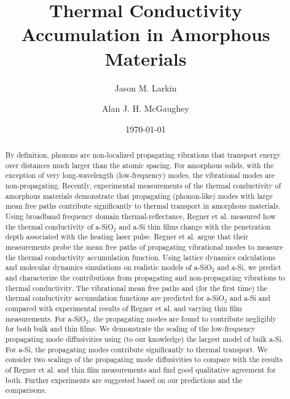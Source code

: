 \documentclass[aps,prb,twocolumn,superscriptaddress,footinbib,amsmath,amssymb,floatfix]{revtex4}
\begin{document}
\title{Thermal Conductivity Accumulation in Amorphous Materials}
\author{Jason M. Larkin}
\author{Alan J. H. McGaughey}
\date{\today}
\begin{abstract}

By definition, phonons are non-localized propagating vibrations that 
transport energy over distances much larger than the atomic spacing. For 
amorphous solids, with the 
exception 
of very long-wavelength (low-frequency) modes, the vibrational modes are 
non-propagating. 
Recently, 
experimental measurements of the thermal conductivity of amorphous 
materials demonstrate that 
propagating (phonon-like) modes with large mean free paths 
contribute significantly to thermal transport in amorphous 
materials.\cite{regner_broadband_2013,sultan_heat_2013} 
Using broadband frequency domain thermal-reflectance, 
Regner et al. measured how the thermal conductivity of a-SiO$_2$ and 
a-Si thin films change with the penetration depth associated with the 
heating laser pulse.\cite{regner_broadband_2013} 
Regner et al. argue that their measurements probe the mean free 
paths of propagating vibrational modes to measure the 
thermal conductivity accumulation function.    
Using lattice dynamics calculations and molecular dynamics simulations 
on 
realistic models of a-SiO$_2$ and a-Si, we predict and 
characterize the contributions from propagating and non-propagating 
vibrations 
to thermal conductivity. The vibrational mean free paths 
and (for the first time) the thermal 
conductivity accumulation functions are predicted for a-SiO$_2$ and a-Si 
and compared with experimental results of 
Regner et al. and varying thin film measurements. 
For a-SiO$_2$, the propagating modes are found to contribute 
negligibly for both bulk and thin films. We demonstrate the scaling 
of the low-frequency propagating mode diffusivities using 
(to our knowledge) the largest model of bulk a-Si.   
For a-Si, the propagating modes contribute significantly to thermal 
transport. We consider two scalings of the propagating mode 
diffusivities to compare with the results of Regner et al. and thin 
film measurements and find 
good qualitative agreement for both. Further 
experiments are suggested based on our predictions and the comparisons. 
\end{abstract}
\maketitle
\end{document}
